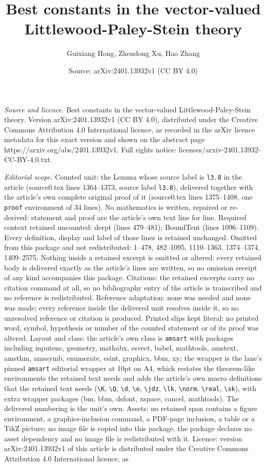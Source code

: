 \documentclass[10pt,a4paper]{amsart}
\title[Best constants in the vector-valued Littlewood-Paley-Stein t]{Best constants in the vector-valued Littlewood-Paley-Stein theory}
\author{Guixiang Hong, Zhendong Xu, Hao Zhang}
\date{Source: arXiv:2401.13932v1 (CC BY 4.0)}
\begin{document}
\maketitle

\noindent\emph{Source and licence.} Best constants in the vector-valued Littlewood-Paley-Stein theory. Version arXiv:2401.13932v1 (CC BY 4.0), distributed under the Creative Commons Attribution 4.0 International licence, as recorded in the arXiv licence metadata for this exact version and shown on the abstract page https://arxiv.org/abs/2401.13932v1. Full rights notice: licenses/arxiv-2401.13932-CC-BY-4.0.txt.\par\smallskip

\noindent\textit{Editorial scope.} Counted unit: the Lemma whose source label is \texttt{l3.8} in the article (source0.tex lines 1364--1373, source label \texttt{l3.8}), delivered together with the article's own complete original proof of it (source0.tex lines 1375--1408, one \texttt{proof} environment of 34 lines). No mathematics is written, repaired or re-derived: statement and proof are the article's own text line for line. Required context retained uncounted: derpt (lines 479--481); BoundTent (lines 1096--1109). Every definition, display and label of those lines is retained unchanged. Omitted from this package and not redistributed: 1--478, 482--1095, 1110--1363, 1374--1374, 1409--2575. Nothing inside a retained excerpt is omitted or altered: every retained body is delivered exactly as the article's lines are written, so no omission receipt of any kind accompanies this package. Citations: the retained excerpts carry no citation command at all, so no bibliography entry of the article is transcribed and no reference is redistributed. Reference adaptation: none was needed and none was made; every reference inside the delivered unit resolves inside it, so no unresolved reference or citation is produced. Printed slips kept literal: no printed word, symbol, hypothesis or number of the counted statement or of its proof was altered. Layout and class: the article's own class is \texttt{amsart} with packages including inputenc, geometry, mathabx, esvect, babel, mathtools, amstext, amsthm, amssymb, enumerate, esint, graphicx, bbm, xy; the wrapper is the lane's pinned \texttt{amsart} editorial wrapper at 10pt on A4, which restates the theorem-like environments the retained text needs and adds the article's own macro definitions that the retained text needs (\texttt{\textbackslash K}, \texttt{\textbackslash Q}, \texttt{\textbackslash d}, \texttt{\textbackslash e}, \texttt{\textbackslash jdz}, \texttt{\textbackslash lk}, \texttt{\textbackslash norm}, \texttt{\textbackslash real}, \texttt{\textbackslash sk}), with extra wrapper packages (bm, bbm, dsfont, xspace, cancel, mathtools). The delivered numbering is the unit's own. Assets: no retained span contains a figure environment, a graphics-inclusion command, a PDF-page inclusion, a table or a TikZ picture; no image file is copied into this package, the package declares no asset dependency and no image file is redistributed with it. Licence: version arXiv:2401.13932v1 of this article is distributed under the Creative Commons Attribution 4.0 International licence, as 
\end{document}
